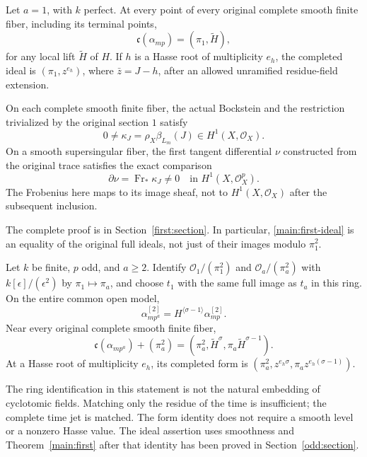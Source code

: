 \begin{theorem}
\label{main:first}
Let $a=1$, with $k$ perfect. At every point of every original complete
smooth finite fiber, including its terminal points,
\begin{equation}
 \mathfrak c(\alpha_{mp})=(\pi_1,\widetilde H),
 \label{main:first-ideal}
\end{equation}
for any local lift $\widetilde H$ of $H$. If $h$ is a Hasse root
of multiplicity $e_h$, the completed ideal is $(\pi_1,z^{e_h})$,
where $\bar z=J-h$, after an allowed unramified residue-field extension.

On each complete smooth finite fiber, the actual Bockstein and the
restriction trivialized by the original section $1$ satisfy
\[
 0\ne\kappa_J=\rho_X\beta_{L_m}(J)\in H^1(X,\mathcal O_X).
\]
On a smooth supersingular fiber, the first tangent differential $\nu$
constructed from the original trace satisfies the exact comparison
\[
 \partial\nu=\operatorname{Fr}_*\kappa_J\ne0
 \quad\text{in }H^1(X,\mathcal O_X^p).
\]
The Frobenius here maps to its image sheaf, not to
$H^1(X,\mathcal O_X)$ after the subsequent inclusion.
\end{theorem}

The complete proof is in Section~\ref{first:section}. In particular,
\eqref{main:first-ideal} is an equality of the original full ideals,
not just of their images modulo $\pi_1^2$.

\begin{theorem}
\label{main:odd}
Let $k$ be finite, $p$ odd, and $a\ge2$. Identify
$\mathcal O_1/(\pi_1^2)$ and $\mathcal O_a/(\pi_a^2)$ with
$k[\epsilon]/(\epsilon^2)$ by $\pi_1\mapsto\pi_a$, and choose
$t_1$ with the same full image as $t_a$ in this ring. On the entire
common open model,
\begin{equation}
 \alpha_{mp^a}^{[2]}=H^{\langle\sigma-1\rangle}\alpha_{mp}^{[2]}.
 \label{main:odd-form}
\end{equation}
Near every original complete smooth finite fiber,
\begin{equation}
 \mathfrak c(\alpha_{mp^a})+(\pi_a^2)
 =(\pi_a^2,\widetilde H^\sigma,\pi_a\widetilde H^{\sigma-1}).
 \label{main:odd-ideal}
\end{equation}
At a Hasse root of multiplicity $e_h$, its completed form is
$(\pi_a^2,z^{e_h\sigma},\pi_a z^{e_h(\sigma-1)})$.
\end{theorem}

The ring identification in this statement is not the natural embedding
of cyclotomic fields. Matching only the residue of the time is
insufficient; the complete time jet is matched. The form identity does
not require a smooth level or a nonzero Hasse value. The ideal assertion
uses smoothness and Theorem~\ref{main:first} after that identity has
been proved in Section~\ref{odd:section}.

